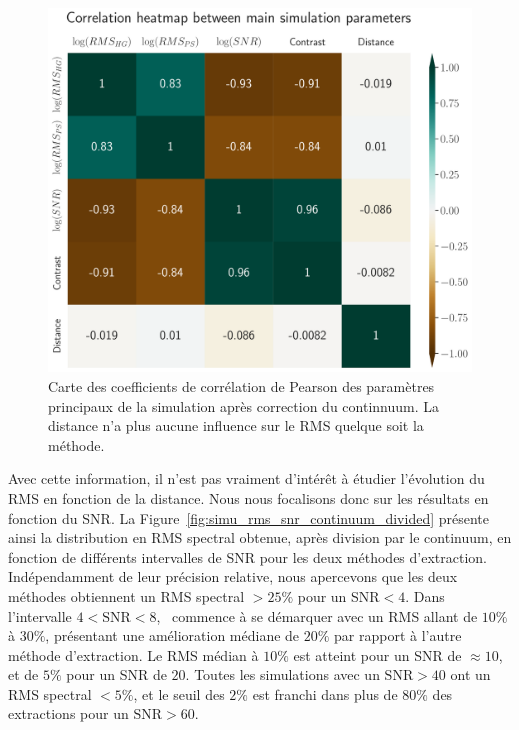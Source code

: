 \documentclass[../main/main.tex]{subfiles}
\begin{document}
\begin{figure}[ht]
  \begin{minipage}[c]{0.6\textwidth}
    \includegraphics[width=\textwidth]{../figures/08_simu/corrheatmap_simu_params.pdf}
  \end{minipage}\hfill
  \begin{minipage}[c]{0.38\textwidth}
    \caption[Corrélation des paramètres de la
    simulation (continuum corrigé).]{Carte des coefficients de corrélation de Pearson des
      paramètres principaux de la
      simulation après correction du continnuum. La distance n'a plus
      aucune influence sur le RMS quelque soit la méthode.}\label{fig:corrheatmap_simuparams}
  \end{minipage}
\end{figure}

Avec cette information, il n'est pas vraiment d'intérêt à étudier
l'évolution du RMS en fonction de la distance. Nous nous focalisons donc
sur les résultats en fonction du SNR. La
Figure~\ref{fig:simu_rms_snr_continuum_divided} présente ainsi la
distribution en RMS spectral obtenue, après division par le continuum, en fonction de différents
intervalles de SNR pour les deux méthodes d'extraction. Indépendamment
de leur précision relative, nous apercevons que les deux méthodes
obtiennent un RMS spectral $>25\%$ pour un SNR$<4$. Dans l'intervalle
$4<\text{SNR}<8$, \hypergal\ commence à se démarquer avec un RMS allant
de $10\%$ à $30\%$, présentant une amélioration médiane de $20\%$ par
rapport à l'autre méthode d'extraction.  Le RMS médian à $10\%$ est
atteint pour un SNR de $\approx10$, et de $5\%$ pour un SNR de
$20$. Toutes les simulations avec un $\text{SNR}>40$ ont un RMS spectral
$<5\%$, et le seuil des $2\%$ est franchi dans plus de $80\%$ des
extractions pour un $\text{SNR}>60$.
\end{document}

